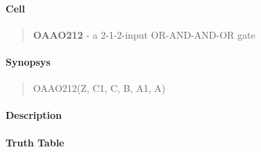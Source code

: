 \label{OAAO212}
\paragraph{Cell}
\begin{quote}
    \textbf{OAAO212} - a 2-1-2-input OR-AND-AND-OR gate
\end{quote}

\paragraph{Synopsys}
\begin{quote}
    OAAO212(Z, C1, C, B, A1, A)
\end{quote}

\paragraph{Description}

%

\paragraph{Truth Table}
%

